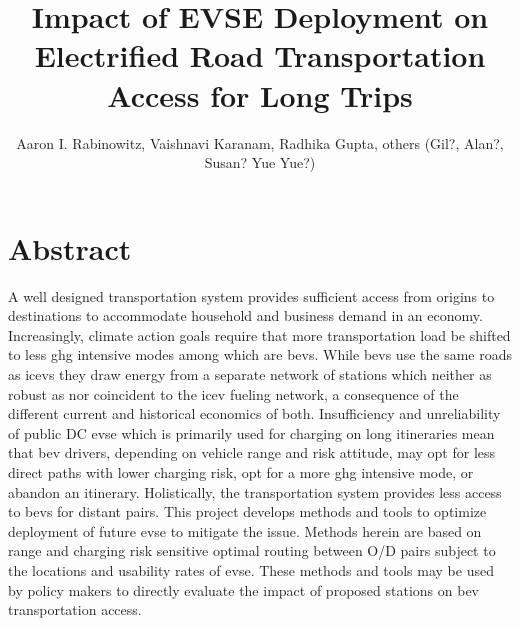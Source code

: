 \documentclass[11pt]{article}
\title{Impact of EVSE Deployment on Electrified Road Transportation Access for Long Trips}
\author{Aaron I. Rabinowitz, Vaishnavi Karanam, Radhika Gupta, others (Gil?, Alan?, Susan? Yue Yue?)}
\date{}
\begin{document}
\maketitle

\section*{Abstract}

A well designed transportation system provides sufficient access from origins to destinations to accommodate household and business demand in an economy.  Increasingly, climate action goals require that more transportation load be shifted to less \gls{ghg} intensive modes among which are \glspl{bev}. While \glspl{bev} use the same roads as \glspl{icev} they draw energy from a separate network of stations which neither as robust as nor coincident to the \gls{icev} fueling network, a consequence of the different current and historical economics of both. Insufficiency and unreliability of public DC \gls{evse} which is primarily used for charging on long itineraries mean that \gls{bev} drivers, depending on vehicle range and risk attitude, may opt for less direct paths with lower charging risk, opt for a more \gls{ghg} intensive mode, or abandon an itinerary. Holistically, the transportation system provides less access to \glspl{bev} for distant pairs. This project develops methods and tools to optimize deployment of future \gls{evse} to mitigate the issue. Methods herein are based on range and charging risk sensitive optimal routing between O/D pairs subject to the locations and usability rates of \gls{evse}. These methods and tools may be used by policy makers to directly evaluate the impact of proposed stations on \gls{bev} transportation access.
\medskip
\end{document}
